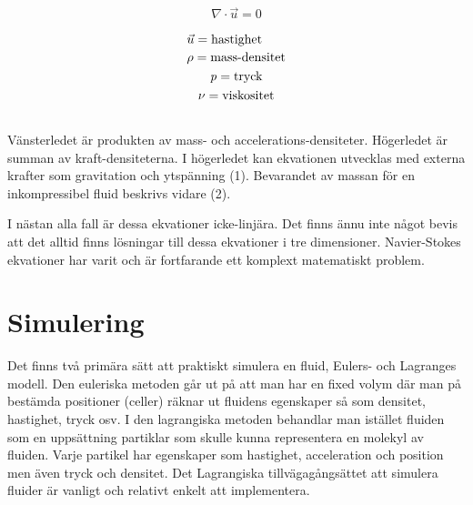 \documentclass[a4paper,12pt,oneside,final]{extarticle}
\begin{document}
\begin{equation}
\nabla \cdot \vec{u} = 0
\end{equation}

\begin{equation*}
\begin{aligned}
\begin{multlined}
\vec{u} = \mbox{hastighet} \\
\rho = \mbox{mass-densitet} \\
\it{p} = \mbox{tryck} \\
\nu = \mbox{viskositet} \\
\end{multlined}
\end{aligned}
\end{equation*}
Vänsterledet är produkten av mass- och accelerations-densiteter.
Högerledet är summan av kraft-densiteterna.
I högerledet kan ekvationen utvecklas med externa krafter som gravitation och ytspänning (1).
Bevarandet av massan för en inkompressibel fluid beskrivs vidare (2).

I nästan alla fall är dessa ekvationer icke-linjära.
Det finns ännu inte något bevis att det alltid finns lösningar till dessa ekvationer i tre dimensioner.
Navier-Stokes ekvationer har varit och är fortfarande ett komplext matematiskt problem.

\section{Simulering}
Det finns två primära sätt att praktiskt simulera en fluid, Eulers- och Lagranges modell.
Den euleriska metoden går ut på att man har en fixed volym där man på bestämda positioner (celler) räknar ut fluidens egenskaper så som densitet, hastighet, tryck osv.
I den lagrangiska metoden behandlar man istället fluiden som en uppsättning partiklar som skulle kunna representera en molekyl av fluiden.
Varje partikel har egenskaper som hastighet, acceleration och position men även tryck och densitet.
Det Lagrangiska tillvägagångsättet att simulera fluider är vanligt och relativt enkelt att implementera.
\end{document}
